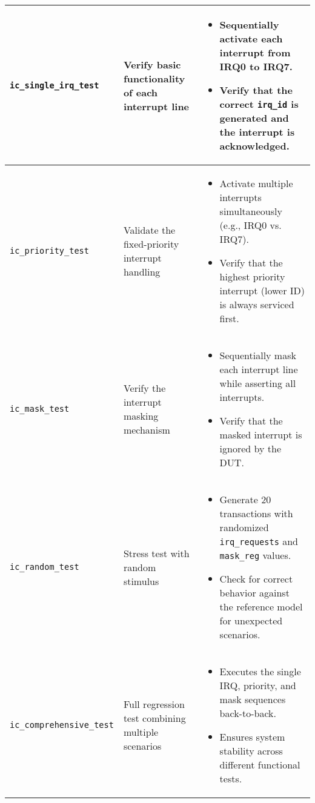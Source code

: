 \documentclass[12pt,a4paper]{article}
\begin{document}
\begin{longtable}{|p{}|p{}|p{}|}
    \texttt{ic\_single\_irq\_test} & Verify basic functionality of each interrupt line & 
    \begin{itemize}[noitemsep, topsep=0pt, partopsep=0pt, leftmargin=*]
        \item Sequentially activate each interrupt from IRQ0 to IRQ7.
        \item Verify that the correct \texttt{irq\_id} is generated and the interrupt is acknowledged.
    \end{itemize} \\
    \hline
    \texttt{ic\_priority\_test} & Validate the fixed-priority interrupt handling & 
    \begin{itemize}[noitemsep, topsep=0pt, partopsep=0pt, leftmargin=*]
        \item Activate multiple interrupts simultaneously (e.g., IRQ0 vs. IRQ7).
        \item Verify that the highest priority interrupt (lower ID) is always serviced first.
    \end{itemize} \\
    \hline
    \texttt{ic\_mask\_test} & Verify the interrupt masking mechanism & 
    \begin{itemize}[noitemsep, topsep=0pt, partopsep=0pt, leftmargin=*]
        \item Sequentially mask each interrupt line while asserting all interrupts.
        \item Verify that the masked interrupt is ignored by the DUT.
    \end{itemize} \\
    \hline
    \texttt{ic\_random\_test} & Stress test with random stimulus & 
    \begin{itemize}[noitemsep, topsep=0pt, partopsep=0pt, leftmargin=*]
        \item Generate 20 transactions with randomized \texttt{irq\_requests} and \texttt{mask\_reg} values.
        \item Check for correct behavior against the reference model for unexpected scenarios.
    \end{itemize} \\
    \hline
    \texttt{ic\_comprehensive\_test} & Full regression test combining multiple scenarios & 
    \begin{itemize}[noitemsep, topsep=0pt, partopsep=0pt, leftmargin=*]
        \item Executes the single IRQ, priority, and mask sequences back-to-back.
        \item Ensures system stability across different functional tests.
    \end{itemize} \\
\end{longtable}
\end{document}
